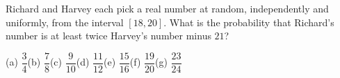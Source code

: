 Richard and Harvey each pick a real number at random, independently and uniformly, from the interval $[18,20]$. What is the probability that Richard's number is at least twice Harvey's number minus $21$?

(a) $\dfrac{3}{4}$\quad (b) $\dfrac{7}{8}$\quad (c) $\dfrac{9}{10}$\quad (d) $\dfrac{11}{12}$\quad (e) $\dfrac{15}{16}$\quad (f) $\dfrac{19}{20}$\quad (g) $\dfrac{23}{24}$
